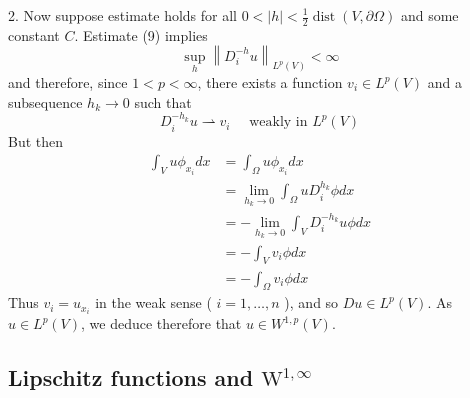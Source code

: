 \begin{theorem}
    2. Now suppose estimate holds for all $0<|h|<\frac{1}{2} \operatorname{dist}(V, \partial \Omega)$ and some constant $C$.
    Estimate (9) implies
    \begin{equation*}
        \sup _h\left\|D_i^{-h} u\right\|_{L^p(V)}<\infty
    \end{equation*}
    and therefore, since $1<p<\infty$, there exists a function $v_i \in L^p(V)$ and a subsequence $h_k \rightarrow 0$ such that
    \begin{equation*}
        D_i^{-h_k} u \rightharpoonup v_i \quad \text { weakly in } L^p(V)
    \end{equation*}
    But then
    \begin{equation*}
        \begin{aligned}
            \int_V u \phi_{x_i} d x & =\int_\Omega u \phi_{x_i} d x                               \\
                                    & =\lim _{h_k \rightarrow 0} \int_\Omega u D_i^{h_k} \phi d x \\
                                    & =-\lim _{h_k \rightarrow 0} \int_V D_i^{-h_k} u \phi d x    \\
                                    & =-\int_V v_i \phi d x                                       \\
                                    & =-\int_\Omega v_i \phi d x
        \end{aligned}
    \end{equation*}
    Thus $v_i=u_{x_i}$ in the weak sense ( $i=1, \ldots, n$ ), and so $D u \in L^p(V)$. As $u \in L^p(V)$, we deduce therefore that $u \in W^{1, p}(V)$.
\end{theorem}

\subsection{Lipschitz functions and \texorpdfstring{$\mathrm{W}^{1, \infty}$}{}}

